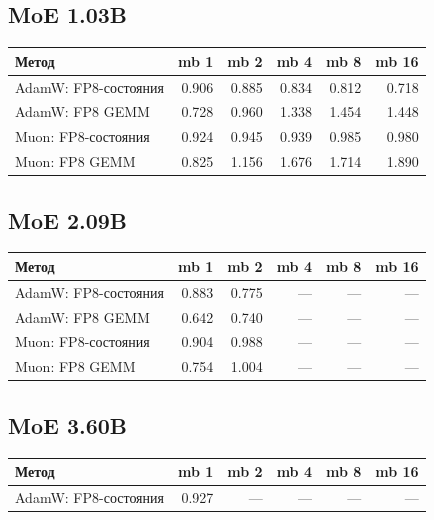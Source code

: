\documentclass[10pt]{article}
\begin{document}
\subsection{MoE 1.03B}
\begin{center}
\small
\begin{tabular}{lrrrrr}
\toprule
\textbf{Метод} & \textbf{mb 1} & \textbf{mb 2} & \textbf{mb 4} & \textbf{mb 8} & \textbf{mb 16} \\
\midrule
AdamW: FP8-состояния & 0.906 & 0.885 & 0.834 & 0.812 & 0.718 \\
AdamW: FP8 GEMM & 0.728 & 0.960 & 1.338 & 1.454 & 1.448 \\
Muon: FP8-состояния & 0.924 & 0.945 & 0.939 & 0.985 & 0.980 \\
Muon: FP8 GEMM & 0.825 & 1.156 & 1.676 & 1.714 & 1.890 \\
\bottomrule
\end{tabular}
\end{center}
\subsection{MoE 2.09B}
\begin{center}
\small
\begin{tabular}{lrrrrr}
\toprule
\textbf{Метод} & \textbf{mb 1} & \textbf{mb 2} & \textbf{mb 4} & \textbf{mb 8} & \textbf{mb 16} \\
\midrule
AdamW: FP8-состояния & 0.883 & 0.775 & --- & --- & --- \\
AdamW: FP8 GEMM & 0.642 & 0.740 & --- & --- & --- \\
Muon: FP8-состояния & 0.904 & 0.988 & --- & --- & --- \\
Muon: FP8 GEMM & 0.754 & 1.004 & --- & --- & --- \\
\bottomrule
\end{tabular}
\end{center}
\subsection{MoE 3.60B}
\begin{center}
\small
\begin{tabular}{lrrrrr}
\toprule
\textbf{Метод} & \textbf{mb 1} & \textbf{mb 2} & \textbf{mb 4} & \textbf{mb 8} & \textbf{mb 16} \\
\midrule
AdamW: FP8-состояния & 0.927 & --- & --- & --- & --- \\
\bottomrule
\end{tabular}
\end{center}
\end{document}
